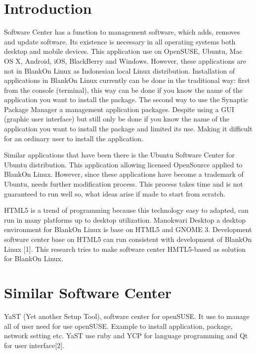 \documentclass[conference, letterpaper]{IEEEtran}
\begin{document}
\section{Introduction}
Software Center has a function to management software, which adds, removes and update software. Its existence is necessary in all operating systems both desktop and mobile devices. This application use on OpenSUSE, Ubuntu, Mac OS X, Android, iOS, BlackBerry and Windows. However, these applications are not in BlankOn Linux as Indonesian local Linux distribution. Installation of applications in BlankOn Linux currently can be done in the traditional way: first from the console (terminal), this way can be done if you know the name of the application you want to install the package. The second way to use the Synaptic Package Manager a management application packages. Despite using a GUI (graphic user interface) but still only be done if you know the name of the application you want to install the package and limited its use. Making it difficult for an ordinary user to install the application.

Similar applications that have been there is the Ubuntu Software Center for Ubuntu distribution. This application allowing licensed OpenSource applied to BlankOn Linux. However, since these applications have become a trademark of Ubuntu, needs further modification process. This process takes time and is not guaranteed to run well so, what ideas arise if made ​​to start from scratch.

HTML5 is a trend of programming because this technology easy to adapted, can run in many platforms up to desktop utilization. Manokwari Desktop a desktop environment for BlankOn Linux is base on HTML5 and GNOME 3. Development software center base on HTML5 can run consistent with development of BlankOn Linux [1]. This research tries to make software center HMTL5-based as solution for BlankOn Linux.

\section{Similar Software Center}

YaST (Yet another Setup Tool), software center for openSUSE. It use to manage all of user need for use openSUSE. Example to install application, package, network setting etc. YaST use ruby and YCP for language programming and Qt for user interface[2].
\end{document}
